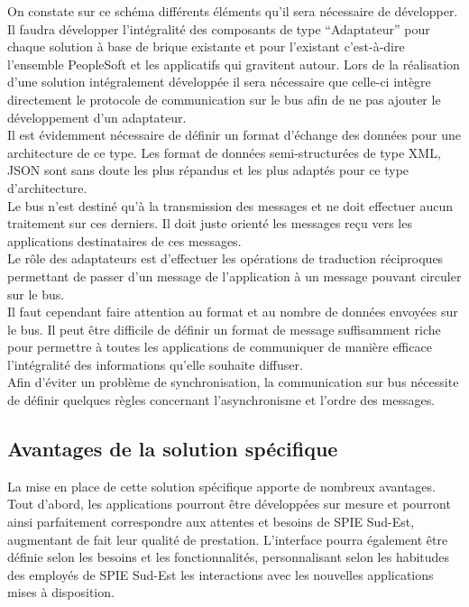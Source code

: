 On constate sur ce schéma différents éléments qu’il sera nécessaire de développer. Il faudra développer l’intégralité des composants de type “Adaptateur” pour chaque solution à base de brique existante et pour l’existant c’est-à-dire l’ensemble PeopleSoft et les applicatifs qui gravitent autour. Lors de la réalisation d’une solution intégralement développée il sera nécessaire que celle-ci intègre directement le protocole de communication sur le bus afin de ne pas ajouter le développement d’un adaptateur. \\
    
Il est évidemment nécessaire de définir un format d’échange des données pour une architecture de ce type. Les format de données semi-structurées de type XML, JSON sont sans doute les plus répandus et les plus adaptés pour ce type d’architecture. \\

Le bus n’est destiné qu’à la transmission des messages et ne doit effectuer aucun traitement sur ces derniers. Il doit juste orienté les messages reçu vers les applications destinataires de ces messages. \\

Le rôle des adaptateurs est d’effectuer les opérations de traduction réciproques permettant de passer d’un message de l’application à un message pouvant circuler sur le bus. \\

Il faut cependant faire attention au format et au nombre de données envoyées sur le bus. Il peut être difficile de définir un format de message suffisamment riche pour permettre à toutes les applications de communiquer de manière efficace l’intégralité des informations qu’elle souhaite diffuser. \\

Afin d’éviter un problème de synchronisation, la communication sur bus nécessite de définir quelques règles concernant l’asynchronisme et l’ordre des messages. 

\subsection{Avantages de la solution spécifique}

La mise en place de cette solution spécifique apporte de nombreux avantages. Tout d’abord, les applications pourront être développées sur mesure et pourront ainsi parfaitement correspondre aux attentes et besoins de SPIE Sud-Est, augmentant de fait leur qualité de prestation. L’interface pourra également être définie selon les besoins et les fonctionnalités, personnalisant selon les habitudes des employés de SPIE Sud-Est les interactions avec les nouvelles applications mises à disposition. \\

